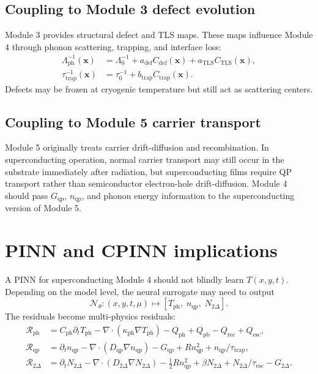 \documentclass[11pt]{article}
\newcommand{\nqp}{n_{\mathrm{qp}}}
\renewcommand{\mfp}{\Lambda}
\newcommand{\x}{\mathbf{x}}
\begin{document}
\subsection{Coupling to Module 3 defect evolution}

Module 3 provides structural defect and TLS maps. These maps influence Module 4 through phonon scattering, trapping, and interface loss:
\begin{align}
\mfp_{\mathrm{ph}}^{-1}(\x) &= \mfp_0^{-1}+a_{\mathrm{def}}C_{\mathrm{def}}(\x)+a_{\mathrm{TLS}}C_{\mathrm{TLS}}(\x),\\
\tau_{\mathrm{trap}}^{-1}(\x)&=\tau_{0}^{-1}+b_{\mathrm{trap}}C_{\mathrm{trap}}(\x).
\end{align}
Defects may be frozen at cryogenic temperature but still act as scattering centers.

\subsection{Coupling to Module 5 carrier transport}

Module 5 originally treats carrier drift-diffusion and recombination. In superconducting operation, normal carrier transport may still occur in the substrate immediately after radiation, but superconducting films require QP transport rather than semiconductor electron-hole drift-diffusion. Module 4 should pass \(G_{\mathrm{qp}}\), \(\nqp\), and phonon energy information to the superconducting version of Module 5.

\section{PINN and CPINN implications}

A PINN for superconducting Module 4 should not blindly learn \(T(x,y,t)\). Depending on the model level, the neural surrogate may need to output
\begin{equation}
\mathcal{N}_\theta:(x,y,t,\mu)\mapsto
\left[T_{\mathrm{ph}},\;\nqp,\;N_{2\Delta}\right].
\end{equation}
The residuals become multi-physics residuals:
\begin{align}
\mathcal{R}_{\mathrm{ph}}&=C_{\mathrm{ph}}\partial_tT_{\mathrm{ph}}-\nabla\cdot(\kappa_{\mathrm{ph}}\nabla T_{\mathrm{ph}})-Q_{\mathrm{ph}}+Q_{\mathrm{pb}}-Q_{\mathrm{rec}}+Q_{\mathrm{esc}},\\
\mathcal{R}_{\mathrm{qp}}&=\partial_t\nqp-\nabla\cdot(D_{\mathrm{qp}}\nabla\nqp)-G_{\mathrm{qp}}+R\nqp^2+\nqp/\tau_{\mathrm{trap}},\\
\mathcal{R}_{2\Delta}&=\partial_tN_{2\Delta}-\nabla\cdot(D_{2\Delta}\nabla N_{2\Delta})-\frac{1}{2}R\nqp^2+\beta N_{2\Delta}+N_{2\Delta}/\tau_{\mathrm{esc}}-G_{2\Delta}.
\end{align}
\end{document}
